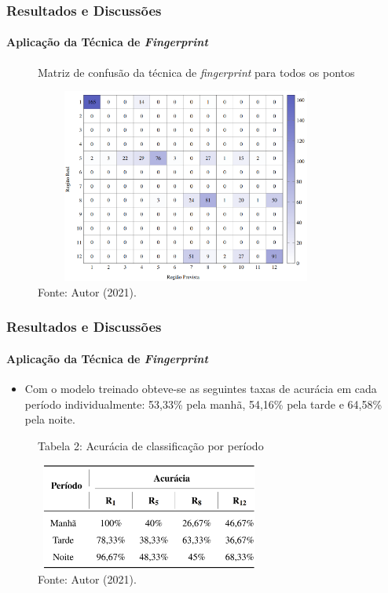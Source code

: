 \documentclass[xcolor={dvipsnames,svgnames,table}]{beamer}
\begin{document}
	\begin{frame}
		\frametitle{Resultados e Discussões}
		\framesubtitle{Aplicação da Técnica de \textit{Fingerprint}}
		\begin{figure}
			\caption{Matriz de confusão da técnica de \textit{fingerprint} para todos os pontos}
			\vspace{-5pt}
			\centering
			\includegraphics[width=10cm, height=6.4cm]{imgs/matrix_confusao.PNG}
			\vspace{-5pt}
			\caption*{\tiny{Fonte: Autor (2021).}}
		\end{figure}
	\end{frame}
	
	\begin{frame}
		\frametitle{Resultados e Discussões}
		\framesubtitle{Aplicação da Técnica de \textit{Fingerprint}}
		\begin{block}{}
			\begin{itemize}[left=0pt]%
				\justifying
				\item Com o modelo treinado obteve-se as seguintes taxas de acurácia em cada período individualmente: 53,33\% pela manhã, 54,16\% pela tarde e 64,58\% pela noite.
			\end{itemize}
		\end{block}
		\begin{figure}
			\caption*{Tabela 2: Acurácia de classificação por período}
			\vspace{-5pt}
			\centering
			\includegraphics[width=7.5cm, height=3.5cm]{imgs/tabela_acuracia_por_periodo.PNG}
			\vspace{-5pt}
			\caption*{\tiny{Fonte: Autor (2021).}}
		\end{figure}
	\end{frame}
	
\end{document}
